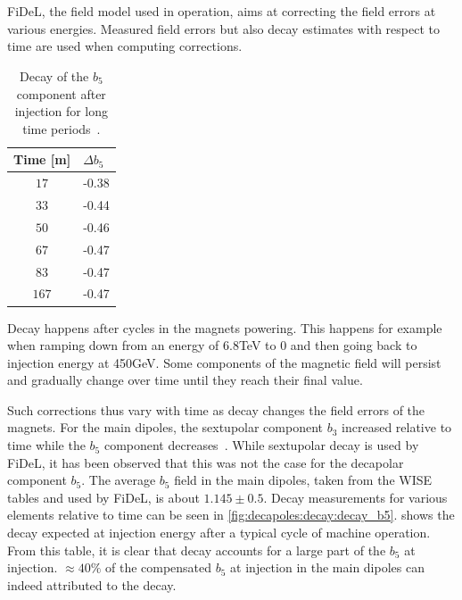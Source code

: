 \section{}
\label{section:decapoles:decay}

FiDeL, the field model used in operation, aims at correcting the field errors at various energies.
Measured field errors but also decay estimates with respect to time are used when computing
corrections.

\begin{table}
    \centering
    \begin{tabular}{cl}
        \toprule
        Time [m] & $\Delta b_5$ \\
        \midrule
        $17$    & -0.38 \\ 
        $33$    & -0.44 \\
        $50$    & -0.46 \\
        $67$    & -0.47 \\
        $83$    & -0.47 \\
        $167$   & -0.47 \\
        \bottomrule
    \end{tabular}
    \caption{Decay of the $b_5$ component after injection for long time
    periods~\cite{deniau_magnetic_2009}.}
    \label{table:decapoles:decay:decay_b5}
\end{table}
 
Decay happens after cycles in the magnets powering. This happens for example when
ramping down from an energy of 6.8TeV to 0 and then going back to injection energy at 450GeV. Some
components of the magnetic field will persist and gradually change over time until they reach their
final value.

Such corrections thus vary with time as decay changes the field errors of the magnets.
For the main dipoles, the sextupolar component $b_3$ increased relative to time while the $b_5$
component decreases~\cite{deniau_magnetic_2009}.
While sextupolar decay is used by FiDeL, it has been observed that this was not the case for the
decapolar component $b_5$. The average $b_5$ field in the main dipoles, taken from the WISE tables
and used by FiDeL, is about $1.145 \pm 0.5$. Decay measurements for various elements relative to
time can be seen in \cref{fig:decapoles:decay:decay_b5}.
 shows the decay expected at injection energy after a typical
cycle of machine operation. From this table, it is clear that decay accounts for a large part of the
$b_5$ at injection. $\approx 40\%$ of the compensated $b_5$ at injection in the main dipoles can
indeed attributed to the decay.

